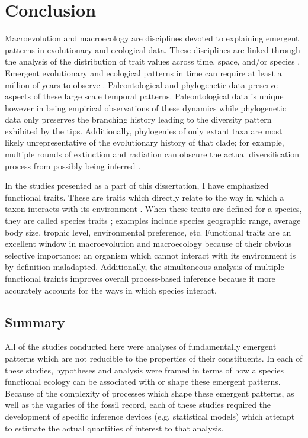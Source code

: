 \chapter{Conclusion} \label{ch:conclusion}

Macroevolution and macroecology are disciplines devoted to explaining emergent patterns in evolutionary and ecological data. These disciplines are linked through the analysis of the distribution of trait values across time, space, and/or species \citep{Mcgill2006,Weber2017}. Emergent evolutionary and ecological patterns in time can require at least a million of years to observe \citep{Uyeda2011a}. Paleontological and phylogenetic data preserve aspects of these large scale temporal patterns. Paleontological data is unique however in being empirical observations of these dynamics while phylogenetic data only preserves the branching history leading to the diversity pattern exhibited by the tips. Additionally, phylogenies of only extant taxa are most likely unrepresentative of the evolutionary history of that clade; for example, multiple rounds of extinction and radiation can obscure the actual diversification process from possibly being inferred \citep{Mitchell2015a,Mitchell2014b,Liow2010a,Quental2009}.

In the studies presented as a part of this dissertation, I have emphasized functional traits. These are traits which directly relate to the way in which a taxon interacts with its environment \citep{Mcgill2006}. When these traits are defined for a species, they are called species traits \citep{Mcgill2006}; examples include species geographic range, average body size, trophic level, environmental preference, etc. Functional traits are an excellent window in macroevolution and macroecology because of their obvious selective importance: an organism which cannot interact with its environment is by definition maladapted. Additionally, the simultaneous analysis of multiple functional traints improves overall process-based inference because it more accurately accounts for the ways in which species interact. 


\section{Summary}

All of the studies conducted here were analyses of fundamentally emergent patterns which are not reducible to the properties of their constituents. In each of these studies, hypotheses and analysis were framed in terms of how a species functional ecology can be associated with or shape these emergent patterns. Because of the complexity of processes which shape these emergent patterns, as well as the vagaries of the fossil record, each of these studies required the development of specific inference devices (e.g. statistical models) which attempt to estimate the actual quantities of interest to that analysis. 

